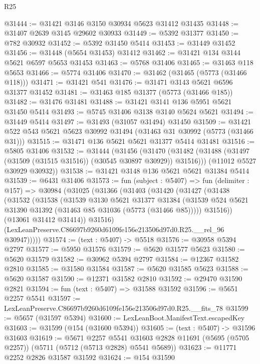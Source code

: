 \begin{lexlean}{R25}
\begin{coremodule}
@31444 := @31421 @3146 @3150 @30934 @5623 @31412 @31435
@31448 := @31407 @2639 @3145 @29602 @30933
@31449 := @5392 @31377
@31450 := @782 @30932
@31452 := @5392 @31450 @5414
@31453 := @31449 @31452
@31456 := @31448 (@5654 @31453) @31412
@31462 := @31421 @134 @3144 @5621 @6597 @5653 @31453
@31463 := @5768 @31406
@31465 := @31463 @118 @5653
@31466 := @5774 @31406
@31470 := @31462 (@31465 (@5773 (@31466 @118)))
@31471 := @31421 @541
@31476 := @31471 @3143 @5621 @6596 @31377 @31452
@31481 := @31463 @185 @31377 (@5773 (@31466 @185))
@31482 := @31476 @31481
@31488 := @31421 @3141 @136 @5951 @5621 @31450 @5414
@31493 := @5745 @31406 @3138 @3140 @5624 @5621
@31494 := @31449 @5414
@31497 := @31493 (@31057 @31494) @31450
@31509 := @31421 @522 @543 @5621 @5623 @30992 @31494 (@31463 @31 @30992 (@5773 (@31466 @31)))
@31515 := @31471 @136 @5621 @5621 @31377 @5414 @31481
@31516 := @5805 @31406
@31532 := @31444
    (@31456
      (@31470 (@31482 (@31488 (@31497 (@31509 (@31515 @31516)) (@30545 @30897 @30929)) @31516)))
      (@11012 @5527 @30929 @30932))
@31538 := @31421 @3148 @136 @5621 @5621 @31384 @5414
@31539 := @6431 @31406
@31573 := fun (subject : @5407) =>
  fun (delimiter : @157) =>
  @30984
    (@31025
      (@31366
        (@31403
          (@31420
            (@31427
              (@31438
                (@31532
                  (@31538
                    (@31539
                      @3130
                      @5621
                      @31377
                      @31384
                      (@31539 @524 @5621 @31390 @31392 (@31463 @85 @31036 (@5773 (@31466 @85)))))
                    @31516))
                (@13061 @31412 @31414))
              @31516)
            (LexLeanPreserve.C86697b9260d6109fe156e213506d97d0.R25.__rel_96 @30947)))))
@31574 := (text : @5407) -> @5518
@31576 := @30958 @5394 @2797
@31577 := @5950 @31576
@31579 := @5620 @31577 @5623
@31580 := @5620 @31579
@31582 := @30962 @5394 @2797
@31584 := @12367 @31582 @2810
@31585 := @31580 @31584
@31587 := @5620 @31585 @5623
@31588 := @5620 @31587
@31590 := @12371 @31582 @2810
@31592 := @29470 @31590 @2821
@31594 := fun (text : @5407) => @31588 @31592
@31596 := @5651 @2257 @5541
@31597 := LexLeanPreserve.C86697b9260d6109fe156e213506d97d0.R25.__fits_78
@31599 := @5657 (@31597 @5394)
@31600 := LexLeanBoot.ManifestText.escapedKey
@31603 := @31599 (@154 (@31600 @5394))
@31605 := (text : @5407) -> @31596 @31603
@31619 := @5671
    @2257
    @5541
    @31603
    @2828
    @11691
    (@5695 (@5705 @2257))
    (@5711 (@5712 (@5713 @2828) @5541 @5689))
@31623 := @11771 @2252 @2826 @31587 @31592
@31624 := @154 @31590

\end{coremodule}
\end{lexlean}
